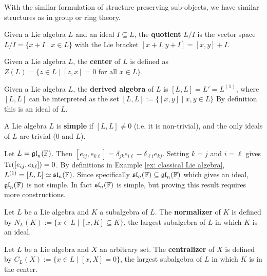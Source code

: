 \documentclass{article}
\begin{document}
\textstart
With the similar formulation of structure preserving sub-objects, we have similar structures as in group or ring theory.

\begin{definition}[Quotient]
    Given a Lie algebra $L$ and an ideal $I \subseteq L$, the \textbf{quotient} $L/I$ is the vector space $L/I = \{ x + I \mid x \in L \}$ with the Lie bracket $[x + I, y + I] = [x, y] + I$.
\end{definition}
\nogap
\begin{definition}[Center]
    Given a Lie algebra $L$, the \textbf{center} of $L$ is defined as $Z(L) = \{ z \in L \mid [z, x] = 0 \text{ for all } x \in L \}$.
\end{definition}
\nogap
\begin{definition}
    Given a Lie algebra $L$, the \textbf{derived algebra} of $L$ is $[L, L] = L' = L^{(1)}$, where $[L, L]$ can be interpreted as the set $[L, L] := \{ [x, y] \mid x, y \in L \}$
    By definition this is an ideal of $L$.
\end{definition}
\nogap
\begin{definition}[Simple]
    A Lie algebra $L$ is \textbf{simple} if $[L, L] \neq 0$ (i.e. it is non-trivial), and the only ideals of $L$ are trivial ($0$ and $L$).
\end{definition}

\begin{example}\label{ex: simple lie algebra}
    Let $L = \mathfrak{gl}_n(\mathbb{F})$. Then $[e_{ij}, e_{k\ell}] = \delta_{jk} e_{i \ell} - \delta_{\ell i} e_{kj}$. Setting $k = j$ and $i = \ell$ gives $\operatorname{Tr}([e_{ij}, e_{k\ell}]) = 0$. By definitions in Example \ref{ex: classical Lie algebra}, $L^{(1)} = [L, L] \simeq \mathfrak{sl}_n(\mathbb{F})$. Since specifically $\mathfrak{sl}_n(\mathbb{F}) \subseteq \mathfrak{gl}_n(\mathbb{F})$ which gives an ideal, $\mathfrak{gl}_n(\mathbb{F})$ is not simple. In fact $\mathfrak{sl}_n(\mathbb{F})$ is simple, but proving this result requires more constructions.
\end{example}

\begin{definition}[Normalizer]
    Let $L$ be a Lie algebra and $K$ a subalgebra of $L$. The \textbf{normalizer} of $K$ is defined by $N_L(K) := \{ x \in L \mid [x, K] \subseteq K \}$, the largest subalgebra of $L$ in which $K$ is an ideal.
\end{definition}
\nogap
\begin{definition}[Centralizer]
    Let $L$ be a Lie algebra and $X$ an arbitrary set. The \textbf{centralizer} of $X$ is defined by $C_L(X) := \{ x \in L \mid [x, X] = 0 \}$, the largest subalgebra of $L$ in which $K$ is in the center.
\end{definition}
\end{document}

